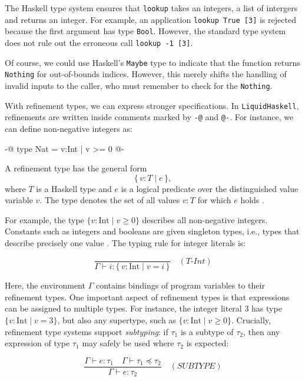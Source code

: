 The Haskell type system ensures that \texttt{lookup} takes an integers, a list of intergers and
returns an integer. For example, an application \texttt{lookup True [3]} is rejected
because the first argument has type \texttt{Bool}. However, the standard type
system does not rule out the erroneous call \texttt{lookup -1 [3]}.

Of course, we could use Haskell's \texttt{Maybe} type to indicate that the function
returns \texttt{Nothing} for out-of-bounds indices. However, this merely shifts the
handling of invalid inputs to the caller, who must remember to check for the \texttt{Nothing}.


With refinement types, we can express stronger specifications. In
\texttt{LiquidHaskell}, refinements are written inside comments marked by
\texttt{-@} and \texttt{@-}. For instance, we can define non-negative integers as:

\begin{code}
	{-@ type Nat = {v:Int | v >= 0} @-}
\end{code}

A refinement type has the general form
\[
	\{\, v:T \mid e \,\},
\]
where \(T\) is a Haskell type and \(e\) is a logical predicate over the
distinguished value variable \(v\). The type denotes the set of all values
\(v:T\) for which \(e\) holds \cite{vazou2014}.

For example, the type \(\{ v:\mathrm{Int} \mid v \geq 0 \}\) describes all
non-negative integers. Constants such as integers and booleans are given
singleton types, i.e., types that describe precisely one value
\cite{niki_lecture_2024}. The typing rule for integer literals is:

\[
	\frac{}{ \Gamma \vdash i : \{\,v:\mathrm{Int} \mid v = i \,\} }
	\quad (\mathit{T\text{-}Int})
\]

Here, the environment \(\Gamma\) contains bindings of program variables to
their refinement types.
One important aspect of refinement types is that expressions can be assigned
to multiple types. For instance, the integer literal \(3\) has type \(\{ v:\mathrm{Int} \mid v = 3 \}\), but also
any supertype, such as \(\{ v:\mathrm{Int} \mid v \geq 0 \}\).
Crucially, refinement type systems support
\emph{subtyping}: if \(\tau_1\) is a subtype of \(\tau_2\), then any expression
of type \(\tau_1\) may safely be used where \(\tau_2\) is expected:

\[
	\frac{ \Gamma \vdash e : \tau_1 \quad \Gamma \vdash \tau_1 \preceq \tau_2 }
	{ \Gamma \vdash e : \tau_2 }
	\quad (\mathit{SUBTYPE})
\]

